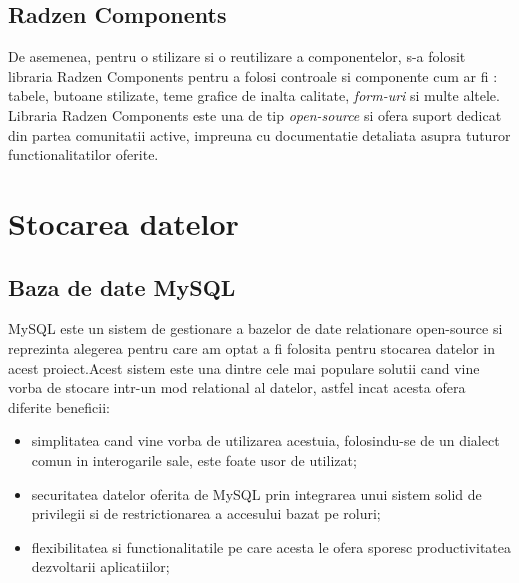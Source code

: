 \subsection*{Radzen Components}
De asemenea, pentru o stilizare si o reutilizare a componentelor, s-a folosit libraria Radzen Components pentru a folosi controale si componente cum ar fi : tabele, butoane stilizate, teme grafice de inalta calitate, \textit{form-uri} si multe altele.\\
 Libraria Radzen Components este una de tip \textit{open-source} si ofera suport dedicat din partea comunitatii active, impreuna cu documentatie detaliata asupra tuturor functionalitatilor oferite.


\section{Stocarea datelor}

 \subsection*{Baza de date MySQL}
	MySQL este un sistem de gestionare a bazelor de date relationare open-source si reprezinta alegerea pentru care am optat a fi folosita pentru stocarea datelor in acest proiect.Acest sistem este una dintre cele mai populare solutii cand vine vorba de stocare intr-un mod relational al datelor, astfel incat acesta ofera diferite beneficii: 
	\begin{itemize}
		
		\item simplitatea cand vine vorba de utilizarea acestuia, folosindu-se de un dialect comun in interogarile sale, este foate usor de utilizat;
		
		\item securitatea datelor oferita de MySQL prin integrarea unui sistem solid de privilegii si de restrictionarea a accesului bazat pe roluri;
		
		\item flexibilitatea si functionalitatile pe care acesta le ofera sporesc productivitatea dezvoltarii aplicatiilor;
	\end{itemize} 
 
